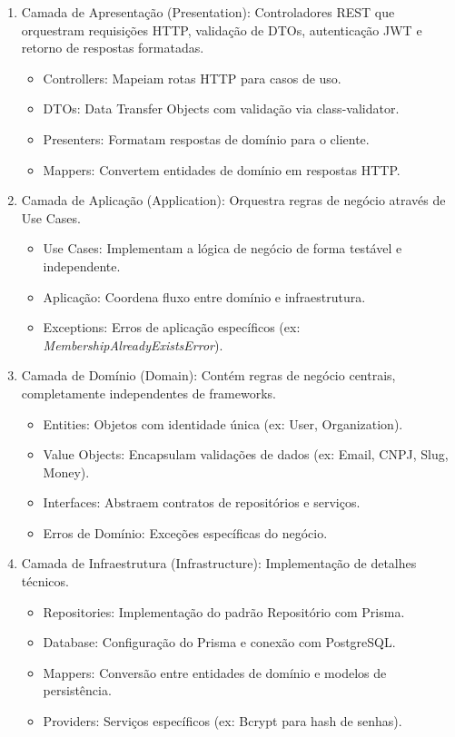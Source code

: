 \begin{enumerate}
\item Camada de Apresentação (Presentation): Controladores REST que orquestram requisições HTTP, validação de DTOs, autenticação JWT e retorno de respostas formatadas.
\begin{itemize}
    \item Controllers: Mapeiam rotas HTTP para casos de uso.
    \item DTOs: Data Transfer Objects com validação via class-validator.
    \item Presenters: Formatam respostas de domínio para o cliente.
    \item Mappers: Convertem entidades de domínio em respostas HTTP.
\end{itemize}

\item Camada de Aplicação (Application): Orquestra regras de negócio através de Use Cases.
\begin{itemize}
    \item Use Cases: Implementam a lógica de negócio de forma testável e independente.
    \item Aplicação: Coordena fluxo entre domínio e infraestrutura.
    \item Exceptions: Erros de aplicação específicos (ex: \textit{MembershipAlreadyExistsError}).
\end{itemize}

\item Camada de Domínio (Domain): Contém regras de negócio centrais, completamente independentes de frameworks.
\begin{itemize}
    \item Entities: Objetos com identidade única (ex: User, Organization).
    \item Value Objects: Encapsulam validações de dados (ex: Email, CNPJ, Slug, Money).
    \item Interfaces: Abstraem contratos de repositórios e serviços.
    \item Erros de Domínio: Exceções específicas do negócio.
\end{itemize}

\item Camada de Infraestrutura (Infrastructure): Implementação de detalhes técnicos.
\begin{itemize}
    \item Repositories: Implementação do padrão Repositório com Prisma.
    \item Database: Configuração do Prisma e conexão com PostgreSQL.
    \item Mappers: Conversão entre entidades de domínio e modelos de persistência.
    \item Providers: Serviços específicos (ex: Bcrypt para hash de senhas).
\end{itemize}


\end{enumerate}
